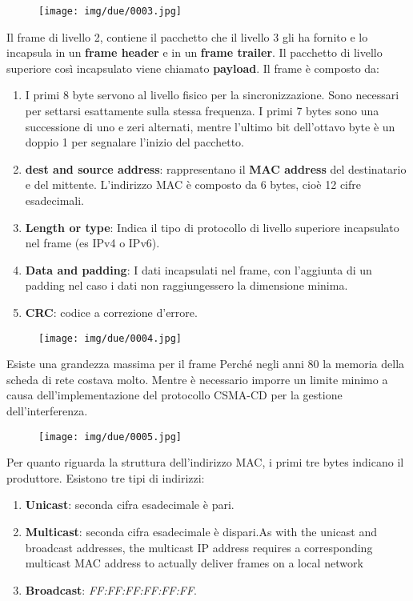 \documentclass{article}
\begin{document}
\begin{figure}[!ht]
    \centering
    \texttt{[image: img/due/0003.jpg]} 
\end{figure}

\noindent Il frame di livello 2, contiene il pacchetto che il livello 3 gli ha fornito e lo incapsula in un \textbf{frame header} e in un
\textbf{frame trailer}. Il pacchetto di livello superiore così incapsulato viene chiamato \textbf{payload}.
Il frame è composto da: \begin{enumerate}
    \item I primi 8 byte servono al livello fisico per la sincronizzazione. Sono necessari per settarsi esattamente sulla stessa frequenza.
    I primi 7 bytes sono una successione di uno e zeri alternati, mentre l'ultimo bit dell'ottavo byte è un doppio 1
    per segnalare l'inizio del pacchetto.
    \item \textbf{dest and source address}: rappresentano il \textbf{MAC address} del destinatario e del mittente. L'indirizzo MAC è composto
    da 6 bytes, cioè 12 cifre esadecimali. 
    \item \textbf{Length or type}: Indica il tipo di protocollo di livello superiore incapsulato nel frame (es IPv4 o IPv6).
    \item \textbf{Data and padding}: I dati incapsulati nel frame, con l'aggiunta di un padding nel caso i dati non raggiungessero la dimensione minima.
    \item \textbf{CRC}: codice a correzione d'errore.
\end{enumerate}

\begin{figure}[!ht]
    \centering
    \texttt{[image: img/due/0004.jpg]} 
\end{figure}
\noindent Esiste una grandezza massima per il frame Perché negli anni 80 la memoria della scheda di rete costava molto. Mentre è necessario imporre un 
limite minimo a causa dell'implementazione del protocollo CSMA-CD per la gestione dell'interferenza.

\begin{figure}[!h]
    \begin{center}
        \texttt{[image: img/due/0005.jpg]}         
    \end{center}
\end{figure}

\noindent Per quanto riguarda la struttura dell'indirizzo MAC, i primi tre bytes indicano il produttore. Esistono tre tipi di indirizzi:
\begin{enumerate}
    \item \textbf{Unicast}: seconda cifra esadecimale è pari.
    \item \textbf{Multicast}: seconda cifra esadecimale è dispari.As with the unicast and broadcast addresses, the multicast IP
     address requires a corresponding multicast MAC address to actually deliver frames on a local network
    \item \textbf{Broadcast}: \textit{FF:FF:FF:FF:FF:FF}.
\end{enumerate}
\end{document}
